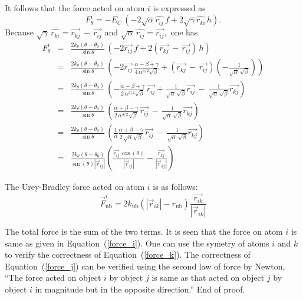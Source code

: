 \documentclass[11pt]{article}
\newcommand{\hatr}[1]{\mbox{$\hat{{r}_{#1}}$}}
\newcommand{\AbsVr}[1]{\mbox{$\left| \vec{r}_{#1} \right| $}}
\begin{document}
It follows that the force acted on atom $i$ is expressed as
\begin{equation}
F_{\theta}^{i} = - E_C\,(-2 \sqrt{\alpha} \hatr{ij} \, f +
2 \sqrt{\gamma} \hatr{ki} \, h).
\end{equation}
Because $\sqrt{\gamma} \, \hatr{ki} = \vec{r_{kj}}\,- \, \vec{r_{ij}}$ 
and $\sqrt{\alpha} \, \hatr{ij} = \vec{r_{ij}},$
one has
\begin{eqnarray}
F_{\theta}^{i} &=& \frac{2 k_{\theta} (\theta - \theta_0)}{\sin\theta}\,
(-2 \vec{r_{ij}} \, f +
2 (\vec{r_{kj}}\,- \, \vec{r_{ij}}) \, h)\nonumber \\
&=& \frac{2 k_{\theta} (\theta - \theta_0)}{\sin\theta}\,
(-2 \vec{r_{ij}}\, \frac{\alpha - \beta + \gamma} 
{4\,\alpha^{3/2}\sqrt{\beta}} +
(\vec{r_{kj}}\,- \, \vec{r_{ij}}) (-\frac{1}{\sqrt{\alpha}\,
\sqrt{\beta}})) \nonumber \\
&=& \frac{2 k_{\theta} (\theta - \theta_0)}{\sin\theta}\,
(- \frac{\alpha - \beta + \gamma} 
{2\,\alpha^{3/2}\sqrt{\beta}}\,\vec{r_{ij}} +
\frac{1}{\sqrt{\alpha}\,
\sqrt{\beta}}  \vec{r_{ij}} \,-\,\frac{1}{\sqrt{\alpha}\,
\sqrt{\beta}}  \vec{r_{kj}})\nonumber \\
&=& \frac{2 k_{\theta} (\theta - \theta_0)}{\sin\theta}\,
(\frac{\alpha + \beta - \gamma} 
{2\,\alpha^{3/2}\sqrt{\beta}}\,\vec{r_{ij}} \,-\,\frac{1}{\sqrt{\alpha}\,
\sqrt{\beta}}  \vec{r_{kj}})\nonumber \\
&=& \frac{2 k_{\theta} (\theta - \theta_0)}{\sin\theta}\,
(\frac{1}{\alpha} \frac{\alpha + \beta - \gamma} 
{2\,\sqrt{\alpha} \sqrt{\beta}}\,\vec{r_{ij}} \,-\,\frac{1}{\sqrt{\alpha}\,
\sqrt{\beta}}  \vec{r_{kj}})\nonumber \\
& = & \frac{ 2k_{\theta}(\theta - \theta_0) }{ \sin(\theta) \AbsVr{ij}
} \left( \frac{ \vec{r_{ij}} \, \cos(\theta) }{ \AbsVr{ij} } -
\frac{\vec{r_{kj}}}{\AbsVr{kj} } \right).
\end{eqnarray}

The Urey-Bradley force acted on atom $i$ is as follows:
\begin{equation}
\vec{F}_{\mathrm{ub}}^i = 2 k_{\mathrm{ub}} (
\AbsVr{ik} - r_{\mathrm{ub}} ) \frac{\vec{r_{ik}}}{\AbsVr{ik}}
\end{equation}

The total force is the sum of the two terms. It is seen that the
force on atom $i$ is same as given in Equation~({\ref{force_i}}). One
can use the symetry of atoms $i$ and $k$ to verify the correctness of 
Equation~({\ref{force_k}}). The correctness of Equation~({\ref{force_j}})
can be verified using the second law of force by Newton, ``The force
acted on object $i$ by object $j$ is same as that acted on object $j$ by
object $i$ in magnitude but in the opposite direction.'' End of proof.
\end{document}
